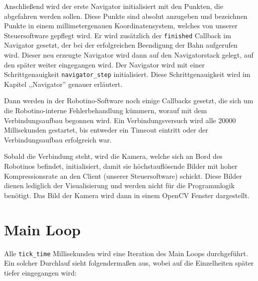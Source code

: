 Anschließend wird der erste Navigator initialisiert mit den Punkten, die
abgefahren werden sollen. Diese Punkte sind absolut anzugeben und bezeichnen
Punkte in einem millimetergenauen Koordinatensystem, welches von unserer
Steuersoftware gepflegt wird. Er wird zusätzlich der \verb|finished| Callback
im Navigator gesetzt, der bei der erfolgreichen Beendigung der Bahn aufgerufen
wird. Dieser neu erzeugte Navigator wird dann auf den Navigatorstack gelegt,
auf den später weiter eingegangen wird. Der Navigator wird mit einer
Schrittgenauigkeit \verb|navigator_step| initialisiert. Diese
Schrittgenauigkeit wird im Kapitel ,,Navigator'' genauer erläutert.

Dann werden in der Robotino-Software noch einige Callbacks gesetzt, die sich um
die Robotino-interne Fehlerbehandlung kümmern, worauf mit dem Verbindungsaufbau
begonnen wird. Ein Verbindungsversuch wird alle 20000 Millisekunden gestartet,
bis entweder ein Timeout eintritt oder der Verbindungsaufbau erfolgreich war.

Sobald die Verbindung steht, wird die Kamera, welche sich an Bord des Robotinos
befindet, initialisiert, damit sie höchstauflösende Bilder mit hoher
Kompressionsrate an den Client (unserer Steuersoftware) schickt. Diese Bilder
dienen lediglich der Visualisierung und werden nicht für die Programmlogik
benötigt. Das Bild der Kamera wird dann in einem OpenCV Fenster dargestellt.


\section{Main Loop}

Alle \verb|tick_time| Millisekunden wird eine Iteration des Main Loops
durchgeführt. Ein solcher Durchlauf sieht folgendermaßen aus, wobei auf die
Einzelheiten später tiefer eingegangen wird:


